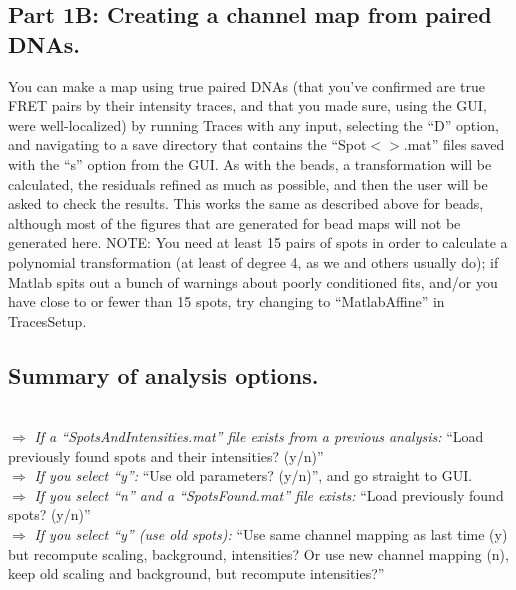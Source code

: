 \documentclass[11pt]{article}
\begin{document}
\subsection{Part 1B: Creating a channel map from paired DNAs.}

You can make a map using true paired DNAs (that you've confirmed are true FRET pairs by their intensity traces, and that you made sure, using the GUI, were well-localized) by running Traces with any input,  selecting the ``D'' option, and navigating to a save directory that contains the ``Spot$<$$>$.mat'' files saved with the ``s'' option from the GUI.  As with the beads, a transformation will be calculated, the residuals refined as much as possible, and then the user will be asked to check the results.  This works the same as described above for beads, although most of the figures that are generated for bead maps will not be generated here.   NOTE: You need at least 15 pairs of spots in order to calculate a polynomial transformation (at least of degree 4, as we and others usually do); if Matlab spits out a bunch of warnings about poorly conditioned fits, and/or you have close to or fewer than 15 spots, try changing to ``MatlabAffine'' in TracesSetup.

\subsection{Summary of analysis options.}\label{sec:AnalysisOptions}

\\

\noindent $\Rightarrow$ {\it If a ``SpotsAndIntensities.mat'' file exists from a previous analysis:} ``Load previously found spots and their intensities? (y/n)''  \\

$\Rightarrow$ {\it If you select ``y'':} ``Use old parameters? (y/n)'', and go straight to GUI.\\

$\Rightarrow$ {\it If you select ``n'' and a ``SpotsFound.mat'' file exists:} ``Load previously found spots? (y/n)''  \\

\indent\indent $\Rightarrow$ {\it If you select ``y'' (use old spots):} ``Use same channel mapping as last time (y) but recompute scaling, background, intensities?  Or use new channel mapping (n), keep old scaling and background, but recompute intensities?''\\
\end{document}
